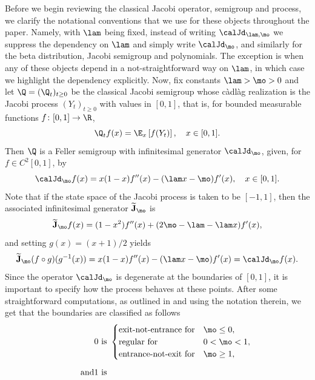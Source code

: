 \begin{appendix}
Before we begin reviewing the classical Jacobi operator, semigroup and process, we clarify the notational conventions that we use for these objects throughout the paper. Namely, with $\lam$ being fixed, instead of writing $\calJd_{\lam,\mo}$ we suppress the dependency on $\lam$ and simply write $\calJd_\mo$, and similarly for the beta distribution, Jacobi semigroup and polynomials. The exception is when any of these objects depend in a not-straightforward way on $\lam$, in which case we highlight the dependency explicitly. Now, fix constants $\lam > \mo > 0$ and let $\Q=(\Q_t)_{t \geq 0}$ be the classical Jacobi semigroup whose càdlàg realization is the Jacobi process $(Y_t)_{t \geq 0}$ with values in $[0,1]$, that is, for bounded measurable functions
$f \colon [0,1] \to \R$,
\begin{equation*}
\Q_t f(x) = \E_x \left[f(Y_t)\right], \quad x \in [0,1].
\end{equation*}
Then $\Q$ is a Feller semigroup with infinitesimal generator $\calJd_\mo$, given, for $f\in C^2[0,1]$, by
\begin{equation*}
\calJd_\mo f(x) = x(1-x)f''(x)-(\lam x -\mo)f'(x), \quad x\in [0,1].
\end{equation*}
Note that if the state space of the Jacobi process is taken to be $[-1,1]$, then the associated infinitesimal generator $\widetilde{\mathbf{J}}_\mo$ is
\begin{equation*}
\widetilde{\mathbf{J}}_\mo f(x) = (1-x^2)f''(x)+(2\mo-\lam-\lam x )f'(x),
\end{equation*}
and setting $g(x)= (x+1)/2$ yields
\begin{equation*}
\widetilde{\mathbf{J}}_\mo (f \circ g) (g^{-1}(x)) = x(1-x)f''(x)-(\lam x-\mo)f'(x) = \calJd_\mo f(x).
\end{equation*}
Since the operator $\calJd_\mo$ is degenerate at the boundaries of $[0,1]$, it is important to specify how the process behaves at these points. After some straightforward computations, as outlined in \cite[Chap.\,2]{Borodin2002} and using the notation therein, we get that the boundaries are classified as follows
\begin{align*}
0 \text{ is }
&\begin{cases}
\text{exit-not-entrance for} & \mo \leq 0,\\
\text{regular for} & 0< \mo < 1,\\
\text{entrance-not-exit for} & \mo \geq 1,
\end{cases}\\[5pt]
\tag*{and}
1 \text{ is }

\end{align*}
\end{appendix}
